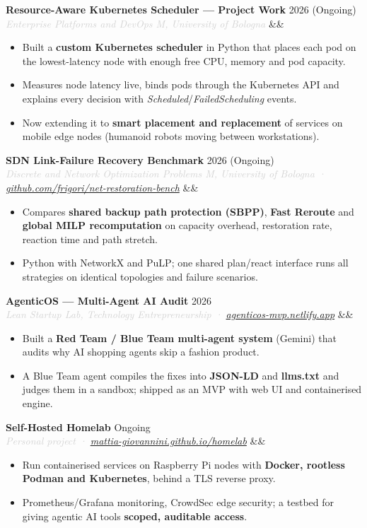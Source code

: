 \documentclass[a4paper,10pt]{article}
\newcommand{\entrylist}[5]{%
  \noindent\textbf{#1} \hfill \textcolor{accent}{#2}\\
  \textit{\textcolor{lightgray}{#3}}%
  \ifx&#4&\else\\\vspace{0.2em}#4\fi
  \vspace{0.3em}
  \begin{itemize}#5\end{itemize}
  \vspace{0.3em}
}
\begin{document}
\entrylist{Resource-Aware Kubernetes Scheduler — Project Work}{2026 (Ongoing)}{Enterprise Platforms and DevOps M, University of Bologna}{}{
  \item Built a \textbf{custom Kubernetes scheduler} in Python that places each pod on the lowest-latency node with enough free CPU, memory and pod capacity.
  \item Measures node latency live, binds pods through the Kubernetes API and explains every decision with \textit{Scheduled}/\textit{FailedScheduling} events.
  \item Now extending it to \textbf{smart placement and replacement} of services on mobile edge nodes (humanoid robots moving between workstations).
}

\entrylist{SDN Link-Failure Recovery Benchmark}{2026 (Ongoing)}{Discrete and Network Optimization Problems M, University of Bologna · \href{https://github.com/frigori/net-restoration-bench}{github.com/frigori/net-restoration-bench}}{}{
  \item Compares \textbf{shared backup path protection (SBPP)}, \textbf{Fast Reroute} and \textbf{global MILP recomputation} on capacity overhead, restoration rate, reaction time and path stretch.
  \item Python with NetworkX and PuLP; one shared plan/react interface runs all strategies on identical topologies and failure scenarios.
}

\entrylist{AgenticOS — Multi-Agent AI Audit}{2026}{Lean Startup Lab, Technology Entrepreneurship · \href{https://agenticos-mvp.netlify.app}{agenticos-mvp.netlify.app}}{}{
  \item Built a \textbf{Red Team / Blue Team multi-agent system} (Gemini) that audits why AI shopping agents skip a fashion product.
  \item A Blue Team agent compiles the fixes into \textbf{JSON-LD} and \textbf{llms.txt} and judges them in a sandbox; shipped as an MVP with web UI and containerised engine.
}

\entrylist{Self-Hosted Homelab}{Ongoing}{Personal project · \href{https://mattia-giovannini.github.io/homelab/}{mattia-giovannini.github.io/homelab}}{}{
  \item Run containerised services on Raspberry Pi nodes with \textbf{Docker, rootless Podman and Kubernetes}, behind a TLS reverse proxy.
  \item Prometheus/Grafana monitoring, CrowdSec edge security; a testbed for giving agentic AI tools \textbf{scoped, auditable access}.
}
\end{document}
